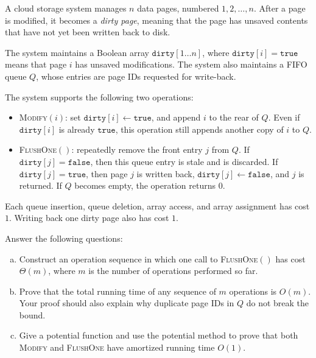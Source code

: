
A cloud storage system manages \(n\) data pages, numbered \(1,2,\ldots,n\). After a page is modified, it becomes a \emph{dirty page}, meaning that the page has unsaved contents that have not yet been written back to disk.

The system maintains a Boolean array \(\texttt{dirty}[1\dots n]\), where \(\texttt{dirty}[i]=\texttt{true}\) means that page \(i\) has unsaved modifications. The system also maintains a FIFO queue \(Q\), whose entries are page IDs requested for write-back.

The system supports the following two operations:
\begin{itemize}
    \item \textsc{Modify}\((i)\): set \(\texttt{dirty}[i] \leftarrow \texttt{true}\), and append \(i\) to the rear of \(Q\). Even if \(\texttt{dirty}[i]\) is already \(\texttt{true}\), this operation still appends another copy of \(i\) to \(Q\).
    \item \textsc{FlushOne}\(()\): repeatedly remove the front entry \(j\) from \(Q\). If \(\texttt{dirty}[j]=\texttt{false}\), then this queue entry is stale and is discarded. If \(\texttt{dirty}[j]=\texttt{true}\), then page \(j\) is written back, \(\texttt{dirty}[j] \leftarrow \texttt{false}\), and \(j\) is returned. If \(Q\) becomes empty, the operation returns \(0\).
\end{itemize}

Each queue insertion, queue deletion, array access, and array assignment has cost \(1\). Writing back one dirty page also has cost \(1\).

Answer the following questions:
\begin{enumerate}[(a)]
    \item Construct an operation sequence in which one call to \textsc{FlushOne}\(()\) has cost \(\Theta(m)\), where \(m\) is the number of operations performed so far.
    \item Prove that the total running time of any sequence of \(m\) operations is \(O(m)\). Your proof should also explain why duplicate page IDs in \(Q\) do not break the bound.
    \item Give a potential function and use the potential method to prove that both \textsc{Modify} and \textsc{FlushOne} have amortized running time \(O(1)\).
\end{enumerate}


